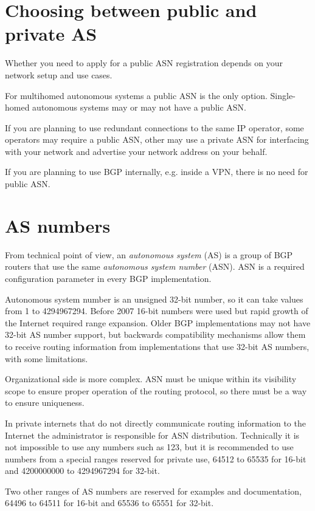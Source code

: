 \section{Choosing between public and private AS}

Whether you need to apply for a public ASN registration depends on your network setup and use cases.

For multihomed autonomous systems a public ASN is the only option. Single-homed autonomous systems may or may not
have a public ASN.

If you are planning to use redundant connections to the same IP operator, some operators may require a public ASN,
other may use a private ASN for interfacing with your network and advertise your network address on your behalf.

If you are planning to use BGP internally, e.g. inside a VPN, there is no need for public ASN.

\section{AS numbers}

From technical point of view, an \emph{autonomous system} (AS) is a group of BGP routers that use the same
\emph{autonomous system number} (ASN). ASN is a required configuration parameter in every BGP implementation.

Autonomous system number is an unsigned 32-bit number, so it can take values from 1 to 4294967294.
Before 2007 16-bit numbers were used but rapid growth of the Internet required range expansion\cite{rfc6793}.
Older BGP implementations may not have 32-bit AS number support, but backwards compatibility mechanisms allow
them to receive routing information from implementations that use 32-bit AS numbers, with some limitations.

Organizational side is more complex. ASN must be unique within its visibility scope to ensure proper
operation of the routing protocol, so there must be a way to ensure uniqueness.

In private internets that do not directly communicate routing information to the Internet the administrator is
responsible for ASN distribution. Technically it is not impossible to use any numbers such as 123,
but it is recommended to use numbers from a special ranges reserved for private use, 64512 to 65535 for
16-bit\cite{rfc1930} and 4200000000 to 4294967294 for 32-bit\cite{rfc6996}.

Two other ranges of AS numbers are reserved for examples and documentation, 64496 to 64511 for 16-bit and
65536 to 65551 for 32-bit\cite{rfc5398}.

